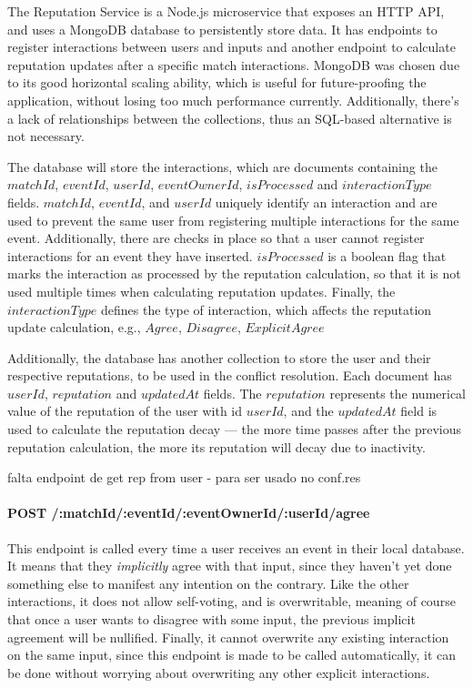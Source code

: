 The Reputation Service is a Node.js microservice that exposes an HTTP API, and uses a \mbox{MongoDB} database to persistently store data. It has endpoints to register interactions between users and inputs and another endpoint to calculate reputation updates after a specific match interactions. MongoDB was chosen due to its good horizontal scaling ability, which is useful for future-proofing the application, without losing too much performance currently. Additionally, there's a lack of relationships between the collections, thus an SQL-based alternative is not necessary.

The database will store the interactions, which are documents containing the $matchId$, $eventId$, $userId$, $eventOwnerId$, $isProcessed$ and $interactionType$ fields. $matchId$, $eventId$, and $userId$ uniquely identify an interaction and are used to prevent the same user from registering multiple interactions for the same event. Additionally, there are checks in place so that a user cannot register interactions for an event they have inserted. $isProcessed$ is a boolean flag that marks the interaction as processed by the reputation calculation, so that it is not used multiple times when calculating reputation updates. Finally, the $interactionType$ defines the type of interaction, which affects the reputation update calculation, e.g., $Agree$, $Disagree$, $Explicit Agree$

Additionally, the database has another collection to store the user and their respective reputations, to be used in the conflict resolution. Each document has $userId$, $reputation$ and $updatedAt$ fields. The $reputation$ represents the numerical value of the reputation of the user with id $userId$, and the $updatedAt$ field is used to calculate the reputation decay --- the more time passes after the previous reputation calculation, the more its reputation will decay due to inactivity.

{\Huge falta endpoint de get rep from user - para ser usado no conf.res}

\paragraph{POST /:matchId/:eventId/:eventOwnerId/:userId/agree}

This endpoint is called every time a user receives an event in their local database. It means that they \textit{implicitly} agree with that input, since they haven't yet done something else to manifest any intention on the contrary. Like the other interactions, it does not allow self-voting, and is overwritable, meaning of course that once a user wants to disagree with some input, the previous implicit agreement will be nullified. Finally, it cannot overwrite any existing interaction on the same input, since this endpoint is made to be called automatically, it can be done without worrying about overwriting any other explicit interactions.

